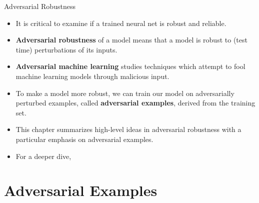 \documentclass[11pt,compress,t,notes=noshow, xcolor=table]{beamer}
\begin{document}

\newcommand{\Dsubtrain}{\mathcal{D}_{\text{subtrain}}}
\newcommand{\Dval}{\mathcal{D}_{\text{val}}}


\begin{frame}{Adversarial Robustness}
    \begin{itemize}
        \item It is critical to examine if a trained neural net is robust and reliable. 
        \item \textbf{Adversarial robustness} of a model means that a model is robust to (test time) perturbations of its inputs. 
        \item \textbf{Adversarial machine learning} studies techniques which attempt  to fool machine learning models through malicious input.
        \item To make a model more robust, we can train our model on adversarially perturbed examples, called \textbf{adversarial examples}, derived from the training set.  
        \item This chapter summarizes  high-level ideas in adversarial robustness with a particular emphasis on adversarial examples.
        \item For a deeper dive, \href{https://adversarial-ml-tutorial.org/}{}
    \end{itemize}
\end{frame}


\section{Adversarial Examples}
\end{document}
